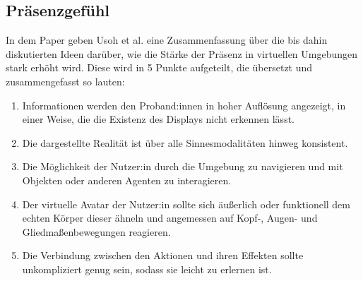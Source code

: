         \subsection{Präsenzgefühl}
            In dem Paper \cite{presence-questionaire} geben Usoh et al. eine Zusammenfassung über die bis dahin diskutierten Ideen darüber, wie die Stärke der Präsenz in virtuellen Umgebungen stark erhöht wird. Diese wird in 5 Punkte aufgeteilt, die übersetzt und zusammengefasst so lauten:

            \begin{enumerate}
                \item Informationen werden den Proband:innen in hoher Auflösung angezeigt, in einer Weise, die die Existenz des Displays nicht erkennen lässt.

                \item Die dargestellte Realität ist über alle Sinnesmodalitäten hinweg konsistent.

                \item  Die Möglichkeit der Nutzer:in durch die Umgebung zu navigieren und mit Objekten oder anderen Agenten zu interagieren.

                \item Der virtuelle Avatar der Nutzer:in sollte sich äußerlich oder funktionell dem echten Körper dieser ähneln und angemessen auf Kopf-, Augen- und Gliedmaßenbewegungen reagieren.

                \item Die Verbindung zwischen den Aktionen und ihren Effekten sollte unkompliziert genug sein, sodass sie leicht zu erlernen ist.
            \end{enumerate}

